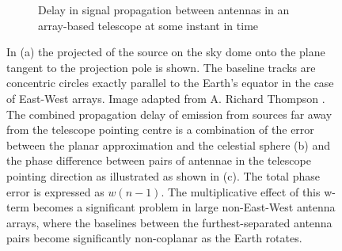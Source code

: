 \begin{figure}[h]
\begin{mdframed}
\begin{subfigure}[b]{0.45\textwidth}
      \caption{Delay in signal propagation between antennas in an array-based telescope at some instant in time}
    \end{subfigure}
    \caption[Widefield phase delay]{In (a) the projected of the source on the sky dome onto the plane tangent to the projection pole is shown. The baseline tracks
    are concentric circles exactly parallel to the Earth's equator in the case of East-West arrays. Image adapted from A. Richard Thompson \cite[Lecture 2]{taylor1999synthesis}. 
    The combined propagation delay of emission from sources far away from the telescope pointing centre is a combination
    of the error between the planar approximation and the celestial sphere (b) and the phase difference between pairs of antennae in the telescope
    pointing direction as illustrated as shown in (c). The total phase error is expressed as $w(n-1)$. The multiplicative effect of this w-term becomes a
    significant problem in large non-East-West antenna arrays, where the baselines between the furthest-separated antenna pairs become significantly non-coplanar 
    as the Earth rotates.}
    \label{fig_wide_field_error}
  \end{mdframed}
\end{figure}

